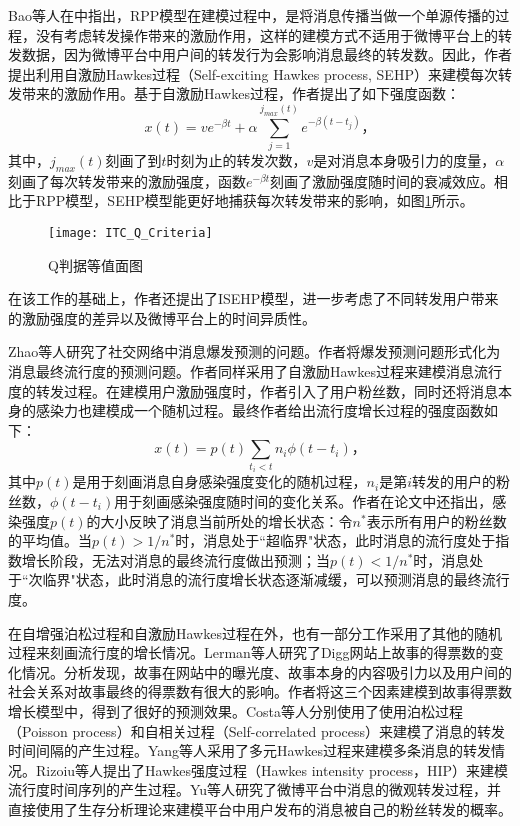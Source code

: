 Bao等人在\citep{bao2015modeling}中指出，RPP模型在建模过程中，是将消息传播当做一个单源传播的过程，没有考虑转发操作带来的激励作用，这样的建模方式不适用于微博平台上的转发数据，因为微博平台中用户间的转发行为会影响消息最终的转发数。因此，作者提出利用自激励Hawkes过程（Self-exciting Hawkes process, SEHP）来建模每次转发带来的激励作用。基于自激励Hawkes过程，作者提出了如下强度函数：
\begin{equation}
\label{eq:hawkesIntensity}
x(t)=v e^{-\beta t}+\alpha \sum_{j=1}^{j_{max}(t)} e^{-\beta(t-t_j)}\text{，}
\end{equation}
其中，$j_{max}(t)$刻画了到$t$时刻为止的转发次数，$v$是对消息本身吸引力的度量，$\alpha$刻画了每次转发带来的激励强度，函数$e^{-\beta t}$刻画了激励强度随时间的衰减效应。相比于RPP模型，SEHP模型能更好地捕获每次转发带来的影响，如图\ref{fig:sehp}所示。
\begin{figure}[!htbp]
  \centering
  \texttt{[image: ITC\_Q\_Criteria]}
  \caption{Q判据等值面图}
  \label{fig:sehp}
\end{figure}
在该工作的基础上，作者还提出了ISEHP模型\citep{bao2016modeling}，进一步考虑了不同转发用户带来的激励强度的差异以及微博平台上的时间异质性。

Zhao等人\citep{zhao2015seismic}研究了社交网络中消息爆发预测的问题。作者将爆发预测问题形式化为消息最终流行度的预测问题。作者同样采用了自激励Hawkes过程来建模消息流行度的转发过程。在建模用户激励强度时，作者引入了用户粉丝数，同时还将消息本身的感染力也建模成一个随机过程。最终作者给出流行度增长过程的强度函数如下：
\begin{equation}
\label{eq:seismic}
x(t)=p(t) \sum_{t_i<t}n_i \phi(t-t_i)\text{，}
\end{equation}
其中$p(t)$是用于刻画消息自身感染强度变化的随机过程，$n_i$是第$i$转发的用户的粉丝数，$\phi(t-t_i)$用于刻画感染强度随时间的变化关系。作者在论文中还指出，感染强度$p(t)$的大小反映了消息当前所处的增长状态：令$n^{\ast}$表示所有用户的粉丝数的平均值。当$p(t)>1/n^{\ast}$时，消息处于``超临界"状态，此时消息的流行度处于指数增长阶段，无法对消息的最终流行度做出预测；当$p(t)<1/n^{\ast}$时，消息处于``次临界"状态，此时消息的流行度增长状态逐渐减缓，可以预测消息的最终流行度。

在自增强泊松过程和自激励Hawkes过程在外，也有一部分工作采用了其他的随机过程来刻画流行度的增长情况。Lerman等人\citep{lerman2010using}研究了Digg网站上故事的得票数的变化情况。分析发现，故事在网站中的曝光度、故事本身的内容吸引力以及用户间的社会关系对故事最终的得票数有很大的影响。作者将这三个因素建模到故事得票数增长模型中，得到了很好的预测效果。Costa等人\citep{ferraz2015rsc}分别使用了使用泊松过程（Poisson process）\citep{kingman1993poisson}和自相关过程（Self-correlated process）来建模了消息的转发时间间隔的产生过程。Yang等人\citep{yang2013mixture}采用了多元Hawkes过程来建模多条消息的转发情况。Rizoiu等人\citep{rizoiu2017expecting}提出了Hawkes强度过程（Hawkes intensity process，HIP）来建模流行度时间序列的产生过程。Yu等人\citep{yu2015micro}研究了微博平台中消息的微观转发过程，并直接使用了生存分析理论来建模平台中用户发布的消息被自己的粉丝转发的概率。

